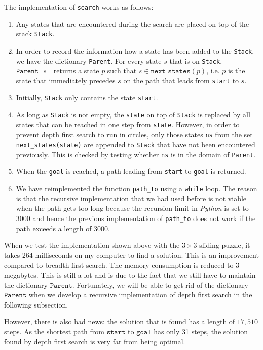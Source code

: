 The implementation of  \texttt{search} works as follows:
\begin{enumerate}
\item Any states that are encountered during the search are placed on top of the stack \texttt{Stack}.
\item In order to record the information how a state has been added to the \texttt{Stack}, we have the dictionary
      \texttt{Parent}.  For every state $s$ that is on \texttt{Stack}, $\texttt{Parent}[s]$ returns a state $p$
      such that $s \in \texttt{next\_states}(p)$,  i.e. $p$ is the state that immediately precedes $s$ on the
      path that leads from \texttt{start} to $s$.  
\item Initially, \texttt{Stack} only contains the state \texttt{start}.
\item As long as \texttt{Stack} is not empty, the \texttt{state} on top of \texttt{Stack} is replaced by all
      states that can be reached in one step from \texttt{state}.  However, in order to prevent depth first search
      to run in circles, only those states \texttt{ns} from the set \texttt{next\_states(state)} are appended to
      \texttt{Stack} that have not been encountered previously.  This is checked by testing 
      whether \texttt{ns} is in the domain of \texttt{Parent}.
\item When the \texttt{goal} is reached,  a path leading from \texttt{start} to \texttt{goal} is returned.
\item We have reimplemented the function \texttt{path\_to} using a \texttt{while} loop.  The reason is that 
      the recursive implementation that we had used before is not viable when the path gets too long because
      the recursion limit in \textsl{Python} is set to 3000 and hence the previous implementation of
      \texttt{path\_to} does not work if the path exceeds a length of $3000$.
\end{enumerate}
When we test the implementation shown above with the $3 \times 3$ sliding puzzle, it takes 264 milliseconds 
on my computer to find a solution.  This is an improvement compared to breadth first search.
The memory consumption is reduced to 3 megabytes.  This is still a lot and is due to the fact that we still
have to maintain the dictionary $\texttt{Parent}$.  Fortunately, we will 
be able to get rid of the dictionary $\texttt{Parent}$ when we develop a recursive implementation of depth first
search in the following subsection. 

However, there is also bad news: the solution that is found has a length of $17,510$ steps.  As the
shortest path from $\texttt{start}$ to $\texttt{goal}$ has only 31 steps, the solution found by depth
first search is very far from being optimal.

